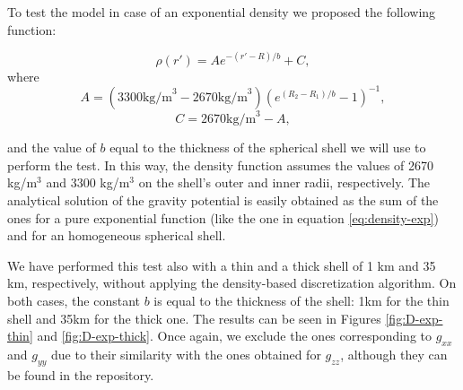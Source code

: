 \documentclass[extra]{gji}
\begin{document}
To test the model in case of an exponential density we proposed the following function:

\begin{equation}
    \rho(r') = A e^{-(r' - R)/b} + C,
\label{eq:density-exp}
\end{equation}
\noindent where
\begin{equation}
    A =
    (3300 \text{kg/m}^3 - 2670 \text{kg/m}^3)
    \left( e^{( R_2 - R_1 )/b} - 1 \right)^{-1},
\end{equation}
\begin{equation}
    C =
    2670 \text{kg/m}^3 - A,
\end{equation}

\noindent and the value of $b$ equal to the thickness of the spherical shell we will use to perform the test.
In this way, the density function assumes the values of 2670 kg/m$^3$ and 3300 kg/m$^3$ on the shell's outer and inner radii, respectively.
The analytical solution of the gravity potential is easily obtained as the sum of the ones for a pure exponential function (like the one in equation \ref{eq:density-exp}) and for an homogeneous spherical shell.

We have performed this test also with a thin and a thick shell of 1 km and 35 km, respectively, without applying the density-based discretization algorithm.
On both cases, the constant $b$ is equal to the thickness of the shell: 1km for the thin shell and 35km for the thick one.
The results can be seen in Figures \ref{fig:D-exp-thin} and \ref{fig:D-exp-thick}.
Once again, we exclude the ones corresponding to $g_{xx}$ and $g_{yy}$ due to their similarity with the ones obtained for $g_{zz}$, although they can be found in the repository.
\end{document}
